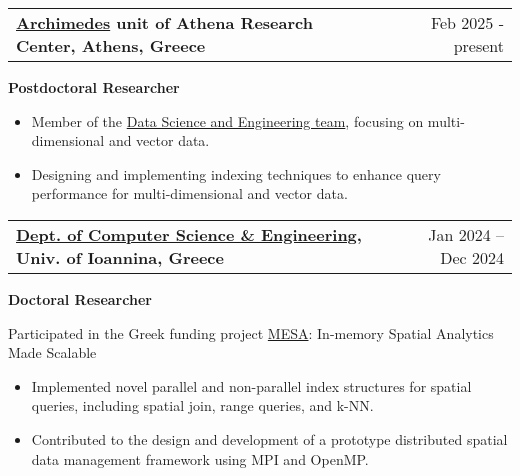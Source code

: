 \documentclass[a4paper,12pt]{article}
\makeatletter
\newenvironment{job}[2]
{
	\begin{tabularx}{\linewidth}{@{}l X r@{}}
		\small
		\textbf{#1} & \hfill &  #2 \\[3.75pt]
	\end{tabularx}
	\begin{minipage}[t]{\linewidth}
		\footnotesize
		\setlength{\parskip}{3pt} %
		\setlength{\parindent}{0pt} %
	}
	{
	\end{minipage}    
}
\makeatother
\begin{document}
\begin{job}{\href{https://archimedesai.gr/en/}{Archimedes} unit of Athena Research Center, Athens, Greece}{Feb 2025 - present}
\textbf{Postdoctoral Researcher}

\begin{itemize}

\item Member of the \href{https://archimedesai.gr/en/research/research-areas/data-science-and-engineering}{Data Science and Engineering team}, focusing on multi-dimensional and vector data.
\item Designing and implementing indexing techniques to enhance query performance for multi-dimensional and vector data.
\end{itemize}

\end{job}


\begin{job}{\href{https://www.cse.uoi.gr/?lang=en}{Dept. of Computer Science \& Engineering}, Univ. of Ioannina, Greece}{Jan 2024 – Dec 2024}
	\textbf{Doctoral Researcher}
	
	Participated in the Greek funding project \href {https://www.cs.uoi.gr/~nikos/mesa/}{MESA}: In-memory Spatial Analytics Made Scalable 
	
	\begin{itemize}
		
		\item Implemented novel parallel and non-parallel index structures for spatial queries, including spatial join, range queries, and k-NN.
		
		\item Contributed to the design and development of a prototype distributed spatial data management framework using MPI and OpenMP.
		
	\end{itemize}
	
\end{job}

\vspace{-1.2\baselineskip}
\end{document}
